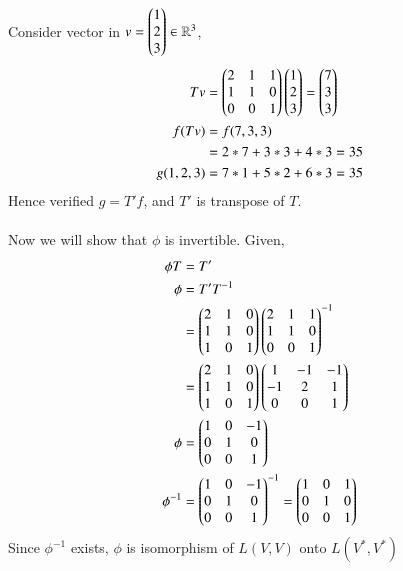 \documentclass[journal,12pt,twocolumn]{IEEEtran}
\begin{document}
Consider vector in $v = \begin{pmatrix}1\\2\\3\end{pmatrix} \in \mathbb{R}^3$,
\begin{align}
	Tv &= \begin{pmatrix}2 & 1 & 1\\ 1 & 1 & 0\\ 0 & 0 & 1\end{pmatrix}\begin{pmatrix}1\\2\\3\end{pmatrix} = \begin{pmatrix}7\\3\\3\end{pmatrix}\\
	f(Tv) &= f(7,3,3)\\
	 &= 2*7 + 3*3 + 4*3 = 35\\
	 g(1,2,3) &= 7*1 + 5*2 + 6*3 = 35 
\end{align}
Hence verified $g = T'f$, and $T'$ is transpose of $T$. \\
\\
Now we will show that $\phi$ is invertible. 
Given,
\begin{align}
	\phi T &= T'\\
	\phi &= T'T^{-1}\\
	&= \begin{pmatrix}2 & 1 & 0\\1 & 1 & 0\\1 & 0 & 1\end{pmatrix}\begin{pmatrix}2 & 1 & 1\\ 1 & 1 & 0\\ 0 & 0 & 1\end{pmatrix}^{-1}\\
	&= \begin{pmatrix}2 & 1 & 0\\1 & 1 & 0\\1 & 0 & 1\end{pmatrix}\begin{pmatrix}1 & -1 & -1\\-1 & 2 & 1\\0 & 0 & 1\end{pmatrix}\\
	\phi &= \begin{pmatrix}1 & 0 & -1\\0 & 1 & 0\\0 & 0 & 1\end{pmatrix}\\
	\phi^{-1} &= \begin{pmatrix}1 & 0 & -1\\0 & 1 & 0\\0 & 0 & 1\end{pmatrix}^{-1} = \begin{pmatrix}1 & 0 & 1\\0 & 1 & 0\\0 & 0 & 1\end{pmatrix}
\end{align}
Since $\phi^{-1}$ exists, $\phi$ is isomorphism of $L(V,V)$ onto $L(V^*,V^*)$
\end{document}
